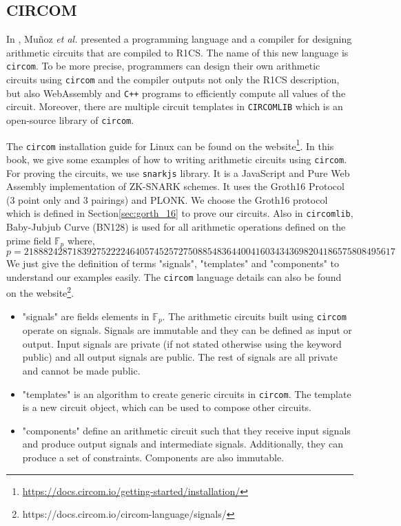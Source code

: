 \documentclass[a4paper,oneside,12pt]{book}
\begin{document}
\subsection{CIRCOM}

In \cite{MunozTapia2022},
 Mu\~{n}oz {\textit{et al.}} presented a programming language
and a compiler for designing arithmetic circuits that are compiled to R1CS. The name of this new language is \verb|circom|. To be more precise, programmers can design their own arithmetic circuits using \verb|circom| and the compiler outputs not only the R1CS description, but also WebAssembly and \verb|C++| programs to efficiently
compute all values of the circuit. Moreover, there are multiple circuit templates in \verb|CIRCOMLIB| which is an open-source library of \verb|circom|. 

The \verb|circom| installation guide for Linux can be found on the website\footnote{\url{https://docs.circom.io/getting-started/installation/}}. In this book, we give some examples of how to writing arithmetic circuits using \verb|circom|. For proving the circuits, we use \verb|snarkjs| library. It is a JavaScript and Pure Web Assembly implementation of ZK-SNARK schemes. It uses the Groth16 Protocol (3 point only and 3 pairings) and PLONK. We choose the Groth16 protocol which is defined in Section\ref{sec:gorth_16} to prove our circuits. Also in \verb|circomlib|, Baby-Jubjub Curve\cite{jubjub} (BN128) is used for all arithmetic operations defined on the prime field $\mathbb{F}_p$ where, \[p = 21888242871839275222246405745257275088548364400416034343698204186575808495617\] We just give the definition of terms "signals", "templates" and "components" to understand our examples easily. The \verb|circom| language details can also be found on the website\footnote{https://docs.circom.io/circom-language/signals/}. 
\begin{itemize}
	\item "signals" are fields elements in $\mathbb{F}_p$. The arithmetic circuits built using \verb|circom| operate on signals. Signals are immutable and they can be defined as input or output. Input signals are private (if not stated otherwise using the keyword public) and all output signals are public. The rest of signals are all private and cannot be made public.
	\item "templates" is an algorithm to create generic circuits in \verb|circom|. The template is a new circuit object, which can be used to compose other circuits.
	\item "components" define an arithmetic circuit such that they receive input signals and produce output signals and  intermediate signals. Additionally, they can produce a set of constraints. Components are also immutable.
\end{itemize}
\end{document}
